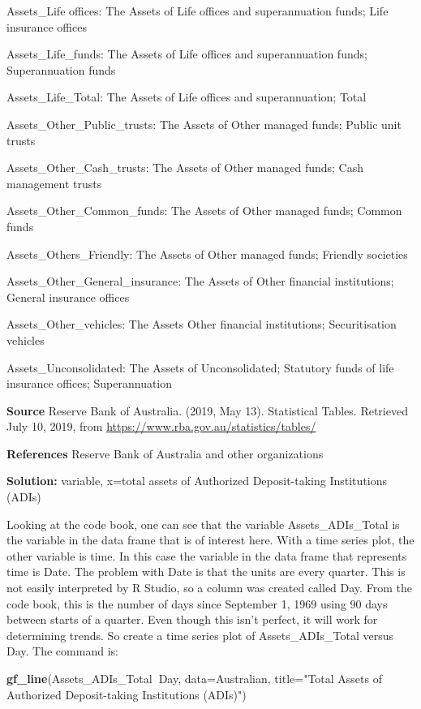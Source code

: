 \documentclass[
]{book}
\newenvironment{Shaded}{\begin{snugshade}}{\end{snugshade}}
\newcommand{\DataTypeTok}[1]{\textcolor[rgb]{0.13,0.29,0.53}{#1}}
\newcommand{\KeywordTok}[1]{\textcolor[rgb]{0.13,0.29,0.53}{\textbf{#1}}}
\newcommand{\NormalTok}[1]{#1}
\newcommand{\OperatorTok}[1]{\textcolor[rgb]{0.81,0.36,0.00}{\textbf{#1}}}
\newcommand{\StringTok}[1]{\textcolor[rgb]{0.31,0.60,0.02}{#1}}
\begin{document}
Assets\_Life offices: The Assets of Life offices and superannuation funds; Life insurance offices

Assets\_Life\_funds: The Assets of Life offices and superannuation funds; Superannuation funds

Assets\_Life\_Total: The Assets of Life offices and superannuation; Total

Assets\_Other\_Public\_trusts: The Assets of Other managed funds; Public unit trusts

Assets\_Other\_Cash\_trusts: The Assets of Other managed funds; Cash management trusts

Assets\_Other\_Common\_funds: The Assets of Other managed funds; Common funds

Assets\_Others\_Friendly: The Assets of Other managed funds; Friendly societies

Assets\_Other\_General\_insurance: The Assets of Other financial institutions; General insurance offices

Assets\_Other\_vehicles: The Assets Other financial institutions; Securitisation vehicles

Assets\_Unconsolidated: The Assets of Unconsolidated; Statutory funds of life insurance offices; Superannuation

\textbf{Source}
Reserve Bank of Australia. (2019, May 13). Statistical Tables. Retrieved July 10, 2019, from \url{https://www.rba.gov.au/statistics/tables/}

\textbf{References}
Reserve Bank of Australia and other organizations

\textbf{Solution:}
variable, x=total assets of Authorized Deposit-taking Institutions (ADIs)

Looking at the code book, one can see that the variable Assets\_ADIs\_Total is the variable in the data frame that is of interest here. With a time series plot, the other variable is time. In this case the variable in the data frame that represents time is Date. The problem with Date is that the units are every quarter. This is not easily interpreted by R Studio, so a column was created called Day. From the code book, this is the number of days since September 1, 1969 using 90 days between starts of a quarter. Even though this isn't perfect, it will work for determining trends. So create a time series plot of Assets\_ADIs\_Total versus Day. The command is:



\begin{Shaded}
\begin{Highlighting}[]
\KeywordTok{gf_line}\NormalTok{(Assets_ADIs_Total}\OperatorTok{~}\NormalTok{Day, }\DataTypeTok{data=}\NormalTok{Australian, }\DataTypeTok{title=}\StringTok{"Total Assets of Authorized Deposit-taking Institutions (ADIs)"}\NormalTok{)}
\end{Highlighting}
\end{Shaded}
\end{document}
